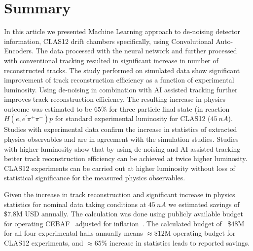 \section{Summary}

In this article we presented Machine Learning approach to de-noising detector information, CLAS12 drift chambers specifically, using Convolutional Auto-Encoders. The data processed with the neural network and further processed with conventional tracking resulted in significant increase in number of reconstructed tracks. The study performed on simulated data show significant improvement of track reconstruction efficiency as a function of experimental luminosity. Using de-noising in combination with AI assisted tracking further improves track reconstruction efficiency. The resulting increase in physics outcome was estimated to be $65\%$ for three particle final state (in reaction $H(e,e^\prime\pi^+\pi^-)p$ for standard experimental luminosity for CLAS12 ($45~nA$). Studies with experimental data confirm the increase in statistics of extracted physics observables and are in agreement with the simulation studies.
Studies with higher luminosity show that by using de-noising and AI assisted tracking better track reconstruction efficiency can be achieved at twice higher luminosity. CLAS12 experiments can be carried out at higher luminosity without loss of statistical significance for the measured physics observables. 

Given the increase in track reconstruction and significant increase in physics statistics for nominal data taking conditions at $45~nA$ we estimated savings of  $\$7.8$M USD annually. The calculation was done using publicly available budget for operating CEBAF~\cite{CEBAF:oper} adjusted for inflation~\cite{GoogleDotCom}. The calculated budget of ~\$$48$M for all four experimental halls annually means $\approx \$12$M operating budget for CLAS12 experiments, and  $\approx 65\%$ increase in statistics leads to reported savings.